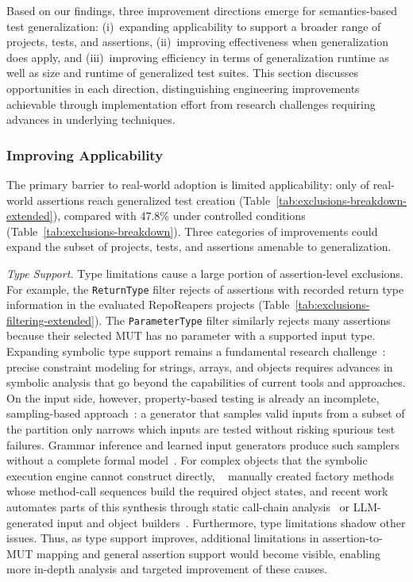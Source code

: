 Based on our findings, three improvement directions emerge for semantics-based test generalization:
(i)~expanding applicability to support a broader range of projects, tests, and assertions,
(ii)~improving effectiveness when generalization does apply,
and (iii)~improving efficiency in terms of generalization runtime
as well as size and runtime of generalized test suites.
This section discusses opportunities in each direction,
distinguishing engineering improvements
achievable through implementation effort
from research challenges requiring advances in underlying techniques.

\subsubsection{Improving Applicability}

The primary barrier to real-world adoption is limited applicability:
only \TzRealworldAssertionsIncludedPct{} of real-world assertions reach generalized test creation (Table~\ref{tab:exclusions-breakdown-extended}),
compared with 47.8\% under controlled conditions (Table~\ref{tab:exclusions-breakdown}).
Three categories of improvements could expand
the subset of projects, tests, and assertions amenable to generalization.

\textit{Type Support.}
Type limitations cause a large portion of assertion-level exclusions.
For example, the \texttt{ReturnType} filter rejects \TzRealworldReturnTypeRejectedPct{}
of assertions with recorded return type information
in the evaluated RepoReapers projects (Table~\ref{tab:exclusions-filtering-extended}).
The \texttt{ParameterType} filter similarly rejects many assertions because their
selected MUT has no parameter with a supported input type.
Expanding symbolic type support remains a fundamental research
challenge~\cite{amadini_2021_string_survey,zhong_2021_arrays,chen_2024_z3noodler,chocholaty_2025_z3noodler,sun_2024_cgs}:
precise constraint modeling for strings, arrays, and objects
requires advances in symbolic analysis
that go beyond the capabilities of current tools and approaches.
On the input side, however, property-based testing is already an incomplete, sampling-based approach~\cite{claessen_2000_quickcheck}:
a generator that samples valid inputs from a subset of the partition only narrows which inputs are tested without risking spurious test failures.
Grammar inference and learned input generators produce such samplers without a complete formal model~\cite{bastani_2017_glade,gopinath_2020_mimid,zhang_2025_g2fuzz}.
For complex objects that the symbolic execution engine cannot construct directly, \citeauthor{thummalapenta_2011_retrofitting}~\cite{thummalapenta_2011_retrofitting} manually created factory methods whose method-call sequences build the required object states, and recent work automates parts of this synthesis through static call-chain analysis~\cite{yang_2026_telpa} or LLM-generated input and object builders~\cite{tu_2026_cottontail}.
Furthermore, type limitations shadow other issues.
Thus, as type support improves,
additional limitations in assertion-to-MUT mapping and general assertion support
would become visible, enabling more in-depth analysis and targeted improvement of these causes.

